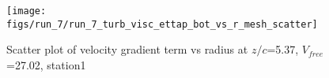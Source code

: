 \begin{figure}[H]
\centering
\texttt{[image: figs/run\_7/run\_7\_turb\_visc\_ettap\_bot\_vs\_r\_mesh\_scatter]}
\caption{Scatter plot of velocity gradient term vs radius at $z/c$=5.37, $V_{free}$=27.02, station1}
\label{fig:run_7_turb_visc_ettap_bot_vs_r_mesh_scatter}
\end{figure}


